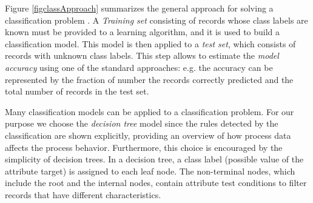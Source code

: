 \documentclass{llncs}
\begin{document}
Figure \ref{figclassApproach} summarizes the general approach for
solving a classification problem \cite{tan2005introduction}. A \emph{Training set}
consisting of records whose class labels are known must be provided to
a learning algorithm, and it is used to build a classification
model. This model is then applied to a \emph{test set}, which consists
of records with unknown class labels.
This step allows to  estimate the \emph{model accuracy} using one of
the standard approaches: e.g. the accuracy can be represented by the
fraction of number the records correctly predicted and the total number of records in the test set.

Many classification models can be applied to a classification
problem. For our purpose we choose the \emph{decision tree} model
since the rules detected by the classification are shown explicitly,
providing an overview of how process data affects the
process behavior. Furthermore, this choice is encouraged by the simplicity of decision trees. In a decision tree, a class label (possible value of the attribute target) is assigned to each leaf node. The non-terminal nodes, which include the root and the internal nodes, contain attribute test conditions to filter records that have different characteristics.

\end{document}
